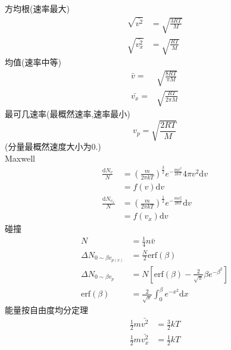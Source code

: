 \documentclass[10pt]{article}
\numberwithin{equation}{section}
\begin{document}
\begin{multicols}{3}
\begin{CJK}{UTF8}{song}
方均根(速率最大)
\begin{align}
  \sqrt{\bar{v^2}} &=\sqrt{\frac{3RT}{M}} \\
  \sqrt{\bar{v_x^2}} &=\sqrt{\frac{RT}{M}}
\end{align}
均值(速率中等)
\begin{align}
  \bar{v}= & \sqrt{\frac{8RT}{\pi M}} \\
  \bar{v_x}= & \sqrt{\frac{RT}{2\pi M}}
\end{align}
最可几速率(最概然速率,速率最小)
\begin{equation}
  v_p=\sqrt{\frac{2RT}{M}}
\end{equation}
(分量最概然速度大小为0.) \\
Maxwell
\begin{align}\nonumber
  \frac{\textrm{d}N_v}{N} &=\left(\frac{m}{2\pi kT}\right)^{\frac{3}{2}}e^{-\frac{mv^2}{2kT}}4\pi v^2 \textrm{d}v \nonumber \\ &=f(v)\textrm{d}v \\
  \frac{\textrm{d}N_{v_x}}{N} &=\left(\frac{m}{2\pi kT}\right)^{\frac{1}{2}}e^{-\frac{mv_x^2}{2kT}} \textrm{d}v \nonumber \\&=f(v_x)\textrm{d}v
\end{align}
碰撞
\begin{align}
N&=\frac{1}{4}n\bar{v}\\
\Delta N_{0\sim\beta v_{p(x)}}&=\frac{N}{2} \textrm{erf} \left(\beta\right)\\
\Delta N_{0\sim \beta v_{p}}&=N\left[ \textrm{erf} (\beta)-\frac{2}{\sqrt\pi}\beta e^{-\beta^2}\right] \\
\textrm{erf} \left(\beta\right)&=\frac{2}{\sqrt\pi}\int_{0}^{\beta}{e^{-x^2}\textrm{d}x}
\end{align}
能量按自由度均分定理
\begin{align}
  \frac{1}{2}m\bar{v^2}&=\frac{3}{2}kT \\
  \frac{1}{2}m\bar{v_x^2}&=\frac{1}{2}kT
\end{align}

\end{CJK}
\end{multicols}
\end{document}
